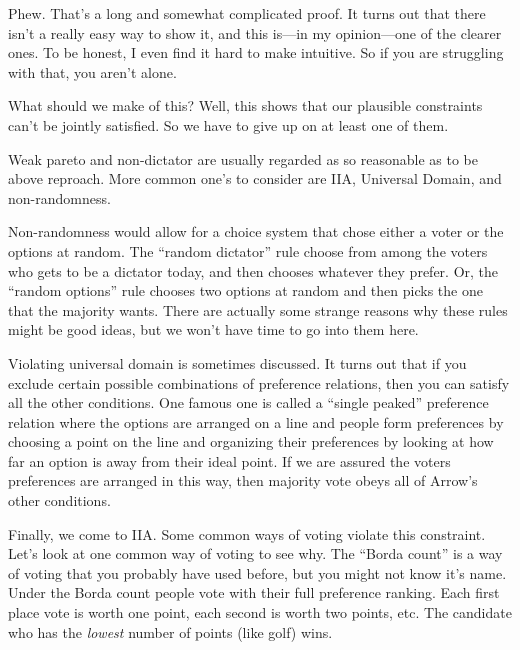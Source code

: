 Phew.  That's a long and somewhat complicated proof.  It turns out that there isn't a really easy way to show it, and this is---in my opinion---one of the clearer ones.  To be honest, I even find it hard to make intuitive. So if you are struggling with that, you aren't alone.

What should we make of this?  Well, this shows that our plausible constraints can't be jointly satisfied. So we have to give up on at least one of them.

Weak pareto and non-dictator are usually regarded as so reasonable as to be above reproach.  More common one's to consider are IIA, Universal Domain, and non-randomness.

Non-randomness would allow for a choice system that chose either a voter or the options at random.  The ``random dictator'' rule choose from among the voters who gets to be a dictator today, and then chooses whatever they prefer.  Or, the ``random options'' rule chooses two options at random and then picks the one that the majority wants. There are actually some strange reasons why these rules might be good ideas, but we won't have time to go into them here.

Violating universal domain is sometimes discussed.  It turns out that if you exclude certain possible combinations of preference relations, then you can satisfy all the other conditions.  One famous one is called a ``single peaked'' preference relation where the options are arranged on a line and people form preferences by choosing a point on the line and organizing their preferences by looking at how far an option is away from their ideal point.  If we are assured the voters preferences are arranged in this way, then majority vote obeys all of Arrow's other conditions.

Finally, we come to IIA. Some common ways of voting violate this constraint. Let's look at one common way of voting to see why.  The ``Borda count'' is a way of voting that you probably have used before, but you might not know it's name.  Under the Borda count people vote with their full preference ranking.  Each first place vote is worth one point, each second is worth two points, etc.  The candidate who has the {\it lowest} number of points (like golf) wins.

